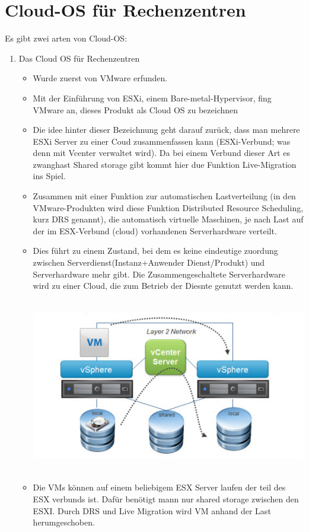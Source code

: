 \documentclass[a4paper,10pt]{article}
\begin{document}
\section{Cloud-OS für Rechenzentren}
Es gibt zwei arten von Cloud-OS:
\begin{enumerate}
	\item Das Cloud OS für Rechenzentren
		\begin{itemize}
			\item Wurde zuerst von VMware erfunden.
			\item Mit der Einführung von ESXi, einem Bare-metal-Hypervisor, fing VMware an, dieses Produkt als Cloud OS zu bezeichnen
			\item Die idee hinter dieser Bezeichnung geht darauf zurück, dass man mehrere ESXi Server zu einer Coud zusammenfassen kann (ESXi-Verbund; was denn mit Vcenter verwaltet wird). Da bei einem Verbund dieser Art es zwanghast Shared storage gibt kommt hier due Funktion Live-Migration ins Spiel.
			\item Zusammen mit einer Funktion zur automatischen Lastverteilung (in den VMware-Produkten wird diese Funktion Distributed Resource Scheduling, kurz DRS genannt), die automatisch virtuelle Maschinen, je nach Last auf der im ESX-Verbund (cloud) vorhandenen Serverhardware verteilt.
			\item Dies führt zu einem Zustand, bei dem es keine eindeutige zuordung zwischen Serverdienst(Instanz+Anwender Dienst/Produkt) und Serverhardware mehr gibt. Die Zusammengeschaltete Serverhardware wird zu einer Cloud, die zum Betrieb der Diesnte genutzt werden kann.
				\begin{center}
					\includegraphics[width=5in,height=3in]{esxiverb.jpg}
				\end{center}

			\item Die VMs können auf einem beliebigem ESX Server laufen der teil des ESX verbunds ist. Dafür benötigt mann nur shared storage zwischen den ESXI. Durch DRS und Live Migration wird VM anhand der Last herumgeschoben.


\end{itemize}
\end{enumerate}
\end{document}
